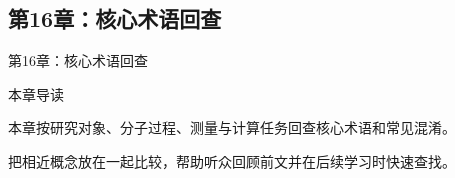 \subsection{第16章：核心术语回查}

\begin{frame}{第16章：核心术语回查}\relax
\vfill\begin{center}\begin{minipage}{.86\linewidth}
{\large\color{AcademicBlue}本章导读\par}\vspace{4mm}
{\Large 本章按研究对象、分子过程、测量与计算任务回查核心术语和常见混淆。\par\vspace{4mm}把相近概念放在一起比较，帮助听众回顾前文并在后续学习时快速查找。\par}
\end{minipage}\end{center}\vfill
{}
\end{frame}

